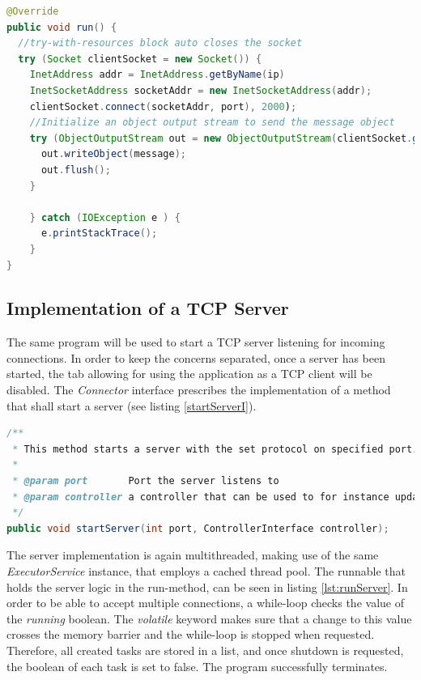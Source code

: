 \begin{minipage}{\linewidth}
	\begin{lstlisting}[language=Java, caption={TCP sendMessageTask implementation},captionpos=b,label=lst:TCPMessageTask]
@Override
public void run() {
  //try-with-resources block auto closes the socket
  try (Socket clientSocket = new Socket()) {
    InetAddress addr = InetAddress.getByName(ip)
    InetSocketAddress socketAddr = new InetSocketAddress(addr);
    clientSocket.connect(socketAddr, port), 2000);
    //Initialize an object output stream to send the message object
    try (ObjectOutputStream out = new ObjectOutputStream(clientSocket.getOutputStream())) {
      out.writeObject(message);
      out.flush();
    }
			
    } catch (IOException e ) {
      e.printStackTrace();
    }
}
	\end{lstlisting}
\end{minipage}

\subsection{Implementation of a TCP Server}

The same program will be used to start a TCP server listening for incoming connections. In order to keep the concerns separated, once a server has been started, the tab allowing for using the application as a TCP client will be disabled. The \textit{Connector} interface prescribes the implementation of a method that shall start a server (see listing \ref{startServerI}). 

\begin{lstlisting}[language=Java, caption={Interface prescribes a startServer method},captionpos=b,label=lst:startServerI]
/**
 * This method starts a server with the set protocol on specified port. The controller will be used to update the interface, especially with received messages.
 *
 * @param port       Port the server listens to
 * @param controller a controller that can be used to for instance update the GUI, display received messages
 */
public void startServer(int port, ControllerInterface controller);
\end{lstlisting}

The server implementation is again multithreaded, making use of the same \textit{ExecutorService} instance, that employs a cached thread pool. The runnable that holds the server logic in the run-method, can be seen in listing \ref{lst:runServer}. In order to be able to accept multiple connections, a while-loop checks the value of the \textit{running} boolean. The \textit{volatile} keyword makes sure that a change to this value crosses the memory barrier and the while-loop is stopped when requested. Therefore, all created tasks are stored in a list, and once shutdown is requested, the boolean of each task is set to false. The program successfully terminates.

